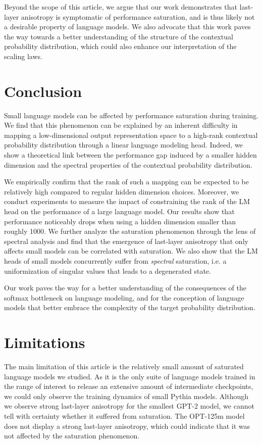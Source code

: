 Beyond the scope of this article, we argue that our work demonstrates that last-layer anisotropy is symptomatic of performance saturation, and is thus likely not a desirable property of language models. We also advocate that this work paves the way towards a better understanding of the structure of the contextual probability distribution, which could also enhance our interpretation of the scaling laws.

\section*{Conclusion}
Small language models can be affected by performance saturation during training. We find that this phenomenon can be explained by an inherent difficulty in mapping a low-dimensional output representation space to a high-rank contextual probability distribution through a linear language modeling head. Indeed, we show a theoretical link between the performance gap induced by a smaller hidden dimension and the spectral properties of the contextual probability distribution.

We empirically confirm that the rank of such a mapping can be expected to be relatively high compared to regular hidden dimension choices. Moreover, we conduct experiments to measure the impact of constraining the rank of the LM head on the performance of a large language model. Our results show that performance noticeably drops when using a hidden dimension smaller than roughly 1000. We further analyze the saturation phenomenon through the lens of spectral analysis and find that the emergence of last-layer anisotropy that only affects small models can be correlated with saturation. We also show that the LM heads of small models concurrently suffer from \textit{spectral} saturation, i.e. a uniformization of singular values that leads to a degenerated state.

Our work paves the way for a better understanding of the consequences of the softmax bottleneck on language modeling, and for the conception of language models that better embrace the complexity of the target probability distribution.

\section*{Limitations}
The main limitation of this article is the relatively small amount of saturated language models we studied. As it is the only suite of language models trained in the range of interest to release an extensive amount of intermediate checkpoints, we could only observe the training dynamics of small Pythia models. Although we observe strong last-layer anisotropy for the smallest GPT-2 model, we cannot tell with certainty whether it suffered from saturation. The OPT-125m model does not display a strong last-layer anisotropy, which could indicate that it was not affected by the saturation phenomenon.

